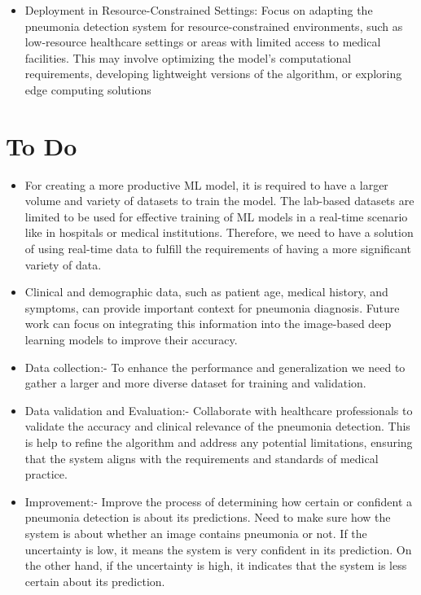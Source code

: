 \begin{itemize}
\item  Deployment in Resource-Constrained Settings: Focus on adapting the pneumonia detection system for resource-constrained environments, such as low-resource healthcare settings or areas with limited access to medical facilities. This may involve optimizing the model's computational requirements, developing lightweight versions of the algorithm, or exploring edge computing solutions\\

\end{itemize}

\section{To Do}

\begin{itemize}

\item For creating a more productive ML model, it is required to have a larger volume and variety of datasets to train the model. The lab-based datasets are limited to be used for effective training of ML models in a real-time scenario like in hospitals or medical institutions. Therefore, we need to have a solution of using real-time data to fulfill the requirements of having a more significant variety of data.\cite{kareem2022review}
	
\item Clinical and demographic data, such as patient age, medical history, and symptoms, can provide important context for pneumonia diagnosis. Future work can focus on integrating this information into the image-based deep learning models to improve their accuracy. \cite{han2021pneumonia}

\item Data collection:-  To enhance the performance and generalization we need to gather a larger and more diverse dataset for training and validation.\\

\item Data validation and Evaluation:- Collaborate with healthcare professionals to validate the accuracy and clinical relevance of the pneumonia detection. This is help to refine the algorithm and address any potential limitations, ensuring that the system aligns with the requirements and standards of medical practice.\\

\item Improvement:- Improve the process of determining how certain or confident a pneumonia detection is about its predictions. Need to make sure how the system is about whether an image contains pneumonia or not. If the uncertainty is low, it means the system is very confident in its prediction. On the other hand, if the uncertainty is high, it indicates that the system is less certain about its prediction.\\


\end{itemize}
